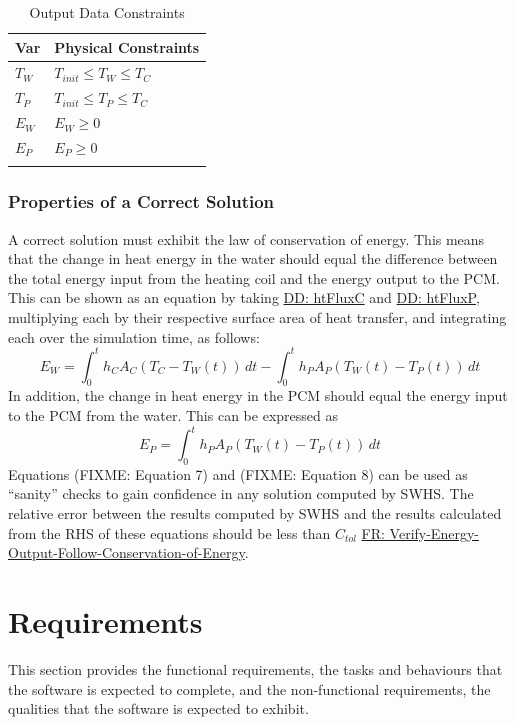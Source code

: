 \documentclass[12pt]{article}
\begin{document}
\begin{longtable}{l l}
\toprule
Var & Physical Constraints
\\
\midrule
\endhead
${T_{W}}$ & ${T_{init}}\leq{}{T_{W}}\leq{}{T_{C}}$
\\
${T_{P}}$ & ${T_{init}}\leq{}{T_{P}}\leq{}{T_{C}}$
\\
${E_{W}}$ & ${E_{W}}\geq{}0$
\\
${E_{P}}$ & ${E_{P}}\geq{}0$
\\
\bottomrule
\caption{Output Data Constraints}
\label{Table:OutDataConstraints}
\end{longtable}
\subsubsection{Properties of a Correct Solution}
\label{Sec:CorSolProps}
A correct solution must exhibit the law of conservation of energy. This means that the change in heat energy in the water should equal the difference between the total energy input from the heating coil and the energy output to the PCM. This can be shown as an equation by taking \hyperref[DD:htFluxC]{DD: htFluxC} and \hyperref[DD:htFluxP]{DD: htFluxP}, multiplying each by their respective surface area of heat transfer, and integrating each over the simulation time, as follows:
\begin{displaymath}
{E_{W}}=\int_{0}^{t}{{h_{C}} {A_{C}} \left({T_{C}}-{T_{W}}\left(t\right)\right)}\,dt-\int_{0}^{t}{{h_{P}} {A_{P}} \left({T_{W}}\left(t\right)-{T_{P}}\left(t\right)\right)}\,dt
\end{displaymath}
In addition, the change in heat energy in the PCM should equal the energy input to the PCM from the water. This can be expressed as
\begin{displaymath}
{E_{P}}=\int_{0}^{t}{{h_{P}} {A_{P}} \left({T_{W}}\left(t\right)-{T_{P}}\left(t\right)\right)}\,dt
\end{displaymath}
Equations (FIXME: Equation 7) and (FIXME: Equation 8) can be used as ``sanity'' checks to gain confidence in any solution computed by SWHS. The relative error between the results computed by SWHS and the results calculated from the RHS of these equations should be less than ${C_{tol}}$ \hyperref[verifyEnergyOutput]{FR: Verify-Energy-Output-Follow-Conservation-of-Energy}.
\section{Requirements}
\label{Sec:Requirements}
This section provides the functional requirements, the tasks and behaviours that the software is expected to complete, and the non-functional requirements, the qualities that the software is expected to exhibit.
\end{document}
